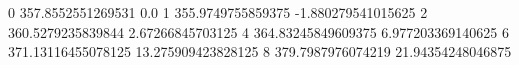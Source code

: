 0 357.8552551269531 0.0
1 355.9749755859375 -1.880279541015625
2 360.5279235839844 2.67266845703125
4 364.83245849609375 6.977203369140625
6 371.13116455078125 13.275909423828125
8 379.7987976074219 21.94354248046875

